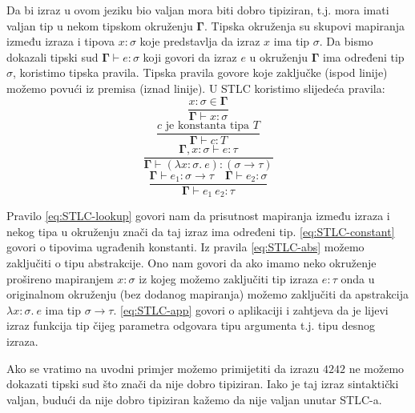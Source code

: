 \documentclass[diplomskirad,upload]{fer}
\begin{document}
Da bi izraz u ovom jeziku bio valjan mora biti dobro tipiziran, t.j. mora imati
valjan tip u nekom tipskom okruženju \(\mathbf{\Gamma}\). Tipska okruženja su
skupovi mapiranja između izraza i tipova \(x:\sigma\) koje predstavlja da izraz
\(x\) ima tip \(\sigma\). Da bismo dokazali tipski sud \(\mathbf{\Gamma} \vdash
e : \sigma\) koji govori da izraz \(e\) u okruženju \(\mathbf{\Gamma}\) ima
određeni tip \(\sigma\), koristimo tipska pravila. Tipska pravila govore koje zaključke
(ispod linije) možemo povući iz premisa (iznad linije). U STLC koristimo
slijedeća pravila:
\begin{equation}
    \frac{x : \sigma \in \mathbf{\Gamma}}{\mathbf{\Gamma} \vdash x: \sigma}
    \label{eq:STLC-lookup}
\end{equation}
\begin{equation}
    \frac{c \text{ je konstanta tipa } T}{\mathbf{\Gamma} \vdash c : T}
    \label{eq:STLC-constant}
\end{equation}
\begin{equation}
    \frac{\mathbf{\Gamma} , x : \sigma \vdash e : \tau}{\mathbf{\Gamma} \vdash
    (\lambda x : \sigma .\ e) : (\sigma \to \tau )}
    \label{eq:STLC-abs}
\end{equation}
\begin{equation}
    \frac{\mathbf{\Gamma} \vdash e_{1} : \sigma \to \tau \quad \mathbf{\Gamma}
    \vdash e_{2} : \sigma}{\mathbf{\Gamma} \vdash e_{1}\ e_{2} : \tau}
    \label{eq:STLC-app}
\end{equation}

Pravilo \ref{eq:STLC-lookup} govori nam da prisutnost mapiranja između izraza i
nekog tipa u okruženju znači da taj izraz ima određeni tip.
\ref{eq:STLC-constant} govori o tipovima ugrađenih konstanti. Iz pravila
\ref{eq:STLC-abs} možemo zaključiti o tipu abstrakcije. Ono nam govori da ako
imamo neko okruženje prošireno mapiranjem \(x : \sigma\) iz kojeg možemo
zaključiti tip izraza \(e : \tau\) onda u originalnom okruženju (bez dodanog
mapiranja) možemo zaključiti da apstrakcija \(\lambda x : \sigma.\ e\) ima tip
\(\sigma \to \tau\). \ref{eq:STLC-app} govori o aplikaciji i zahtjeva da je
lijevi izraz funkcija tip čijeg parametra odgovara tipu argumenta t.j. tipu
desnog izraza.

Ako se vratimo na uvodni primjer možemo primijetiti da izrazu \(42 42\) ne
možemo dokazati tipski sud što znači da nije dobro tipiziran. Iako je taj izraz
sintaktički valjan, budući da nije dobro tipiziran kažemo da nije valjan unutar
STLC-a.
\end{document}
